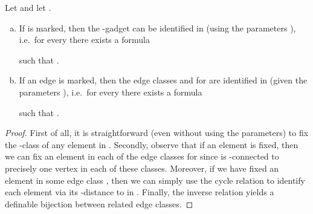 \documentclass[a4paper,UKenglish]{lipics}
\theoremstyle{plain}
\begin{document}
\begin{lemma}\label{lemma:marked:identified}
  Let  and let .
\begin{enumerate}[(a)]
 \item If  is marked, then the -gadget can be 
identified in  (using the parameters ), i.e.\ 
 for every   there exists a formula 
  
 such that .
 \item If an edge  is marked, then the edge classes  and 
 for  are 
identified in  (given the parameters ), i.e.\ 
 for every   there exists a formula 
  
 such that .
\end{enumerate}
\end{lemma}
\begin{proof}
  First of all, it is straightforward (even without using the parameters) 
to fix the -class of any element  in .
  Secondly, observe that if an element  is fixed, then 
we can fix an element in each of the edge classes  for  since  is -connected to 
precisely one vertex in each of these classes. 
Moreover, if we have fixed an element  in some edge class 
, then we can simply use the cycle relation  to identify each 
element  via its -distance to  in .
Finally, the inverse relation  yields a definable bijection between 
related edge classes. 
\end{proof}
\end{document}
